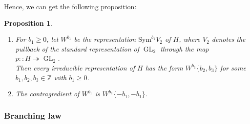 \documentclass[11pt, a4paper]{amsart}
\theoremstyle{plain}
\newtheorem{proposition}[theorem]{Proposition}
\theoremstyle{definition}
\numberwithin{equation}{section}
\DeclareMathOperator{\GL}{\mathrm{GL}}
\begin{document}
Hence, we can get the following proposition: 
\begin{proposition}
    \begin{enumerate}
        \item  For $b_1 \ge 0$, let $W^{b_1}$ be the representation $\mathrm{Sym}^{b_1}V_{2}$ of $H$, where $V_{2}$ denotes the pullback of the standard representation of $\GL_2$ through the map $p \colon: H \twoheadrightarrow \GL_2$. \\
        Then every irreducible representation of $H$ has the form $W^{b_1}\{b_2,b_3\}$ for some $b_1, b_2,b_3 \in \mathbb{Z}$ with $b_1 \ge 0$.
        \item The contragredient of $W^{b_1}$ is $W^{b_1}\{-b_1, -b_1\}$. 
    \end{enumerate}
\end{proposition}

\subsubsection{Branching law}
\end{document}
